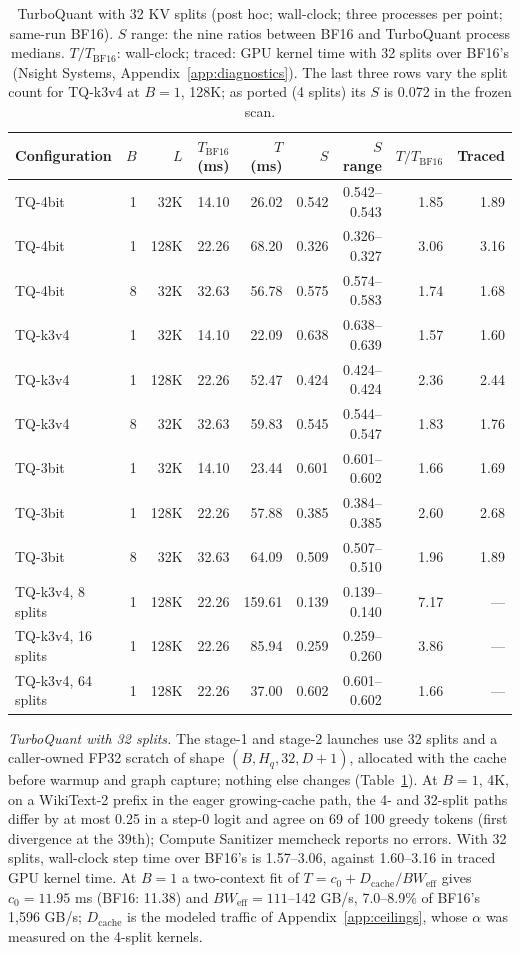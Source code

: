 \begin{table}[t]
\caption{TurboQuant with 32 KV splits (post hoc; wall-clock; three processes per point; same-run BF16).
$S$ range: the nine ratios between BF16 and TurboQuant process medians.
$T / T_{\mathrm{BF16}}$: wall-clock; traced: GPU kernel time with 32 splits over BF16's (Nsight Systems, Appendix~\ref{app:diagnostics}).
The last three rows vary the split count for TQ-k3v4 at $B = 1$, 128K; as ported (4 splits) its $S$ is 0.072 in the frozen scan.}
\label{tab:add-tq}
\vskip 0.1in
\centering
\footnotesize
\setlength{\tabcolsep}{4pt}
\begin{tabular}{@{}lrrrrrrrr@{}}
\toprule
Configuration & $B$ & $L$ & $T_{\mathrm{BF16}}$ (ms) & $T$ (ms) & $S$ & $S$ range & $T / T_{\mathrm{BF16}}$ & Traced \\
\midrule
TQ-4bit & 1 & 32K & 14.10 & 26.02 & 0.542 & 0.542--0.543 & 1.85 & 1.89 \\
TQ-4bit & 1 & 128K & 22.26 & 68.20 & 0.326 & 0.326--0.327 & 3.06 & 3.16 \\
TQ-4bit & 8 & 32K & 32.63 & 56.78 & 0.575 & 0.574--0.583 & 1.74 & 1.68 \\
TQ-k3v4 & 1 & 32K & 14.10 & 22.09 & 0.638 & 0.638--0.639 & 1.57 & 1.60 \\
TQ-k3v4 & 1 & 128K & 22.26 & 52.47 & 0.424 & 0.424--0.424 & 2.36 & 2.44 \\
TQ-k3v4 & 8 & 32K & 32.63 & 59.83 & 0.545 & 0.544--0.547 & 1.83 & 1.76 \\
TQ-3bit & 1 & 32K & 14.10 & 23.44 & 0.601 & 0.601--0.602 & 1.66 & 1.69 \\
TQ-3bit & 1 & 128K & 22.26 & 57.88 & 0.385 & 0.384--0.385 & 2.60 & 2.68 \\
TQ-3bit & 8 & 32K & 32.63 & 64.09 & 0.509 & 0.507--0.510 & 1.96 & 1.89 \\
\midrule
TQ-k3v4, 8 splits & 1 & 128K & 22.26 & 159.61 & 0.139 & 0.139--0.140 & 7.17 & --- \\
TQ-k3v4, 16 splits & 1 & 128K & 22.26 & 85.94 & 0.259 & 0.259--0.260 & 3.86 & --- \\
TQ-k3v4, 64 splits & 1 & 128K & 22.26 & 37.00 & 0.602 & 0.601--0.602 & 1.66 & --- \\
\bottomrule
\end{tabular}
\end{table}

\textit{TurboQuant with 32 splits.}
The stage-1 and stage-2 launches use 32 splits and a caller-owned FP32 scratch of shape $(B, H_q, 32, D + 1)$, allocated with the cache before warmup and graph capture; nothing else changes (Table~\ref{tab:add-tq}).
At $B = 1$, 4K, on a WikiText-2 prefix in the eager growing-cache path, the 4- and 32-split paths differ by at most 0.25 in a step-0 logit and agree on 69 of 100 greedy tokens (first divergence at the 39th); Compute Sanitizer memcheck reports no errors.
With 32 splits, wall-clock step time over BF16's is 1.57--3.06, against 1.60--3.16 in traced GPU kernel time.
At $B = 1$ a two-context fit of $T = c_0 + D_{\mathrm{cache}} / BW_{\mathrm{eff}}$ gives $c_0 = 11.95$ ms (BF16: 11.38) and $BW_{\mathrm{eff}} = 111$--142 GB/s, 7.0--8.9\% of BF16's 1,596 GB/s; $D_{\mathrm{cache}}$ is the modeled traffic of Appendix~\ref{app:ceilings}, whose $\alpha$ was measured on the 4-split kernels.

